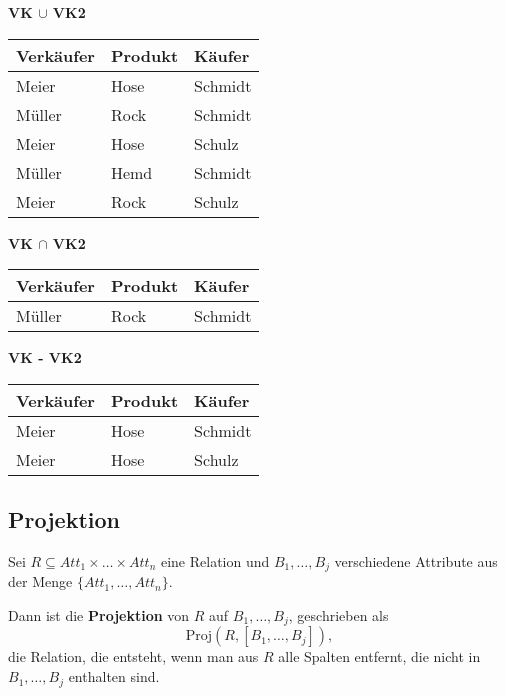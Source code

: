 \begin{table}[H]
    \centering
    \begin{minipage}{0.4\textwidth}
    \centering
    \textbf{VK $\cup$ VK2} \\[3pt]
    \begin{tabularx}{\linewidth}{|X|X|X|}
    \hline
    Verkäufer & Produkt & Käufer \\
    \hline
    Meier & Hose & Schmidt \\
    Müller & Rock & Schmidt \\
    Meier & Hose & Schulz \\
    Müller & Hemd & Schmidt \\
    Meier & Rock & Schulz \\
    \hline
    \end{tabularx}
    \end{minipage}
    \hfill
    \begin{minipage}{0.4\textwidth}
    \centering
    \textbf{VK $\cap$ VK2} \\[3pt]
    \begin{tabularx}{\linewidth}{|X|X|X|}
    \hline
    Verkäufer & Produkt & Käufer \\
    \hline
    Müller & Rock & Schmidt \\
    \hline
    \end{tabularx}
    \vspace{12pt} %

    \centering
    \textbf{VK - VK2} \\[3pt]
    \begin{tabularx}{\linewidth}{|X|X|X|}
    \hline
    Verkäufer & Produkt & Käufer \\
    \hline
    Meier & Hose & Schmidt \\
    Meier & Hose & Schulz \\
    \hline
    \end{tabularx}
    \end{minipage}
\end{table}

\newpage
\subsection{Projektion}
Sei $R \subseteq Att_1 \times \dots \times Att_n$ eine Relation und $B_1, \dots, B_j$ verschiedene Attribute aus der Menge $\{Att_1, \dots, Att_n\}$. 

Dann ist die \textbf{Projektion} von $R$ auf $B_1, \dots, B_j$, geschrieben als
\[
\text{Proj}(R, [B_1, \dots, B_j]),
\]
die Relation, die entsteht, wenn man aus $R$ alle Spalten entfernt, die nicht in $B_1, \dots, B_j$ enthalten sind. 


